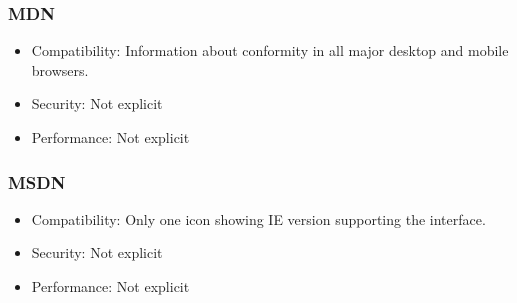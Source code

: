 \subsubsection{MDN}\label{mdn-1}

\begin{itemize}
\tightlist
\item
  Compatibility: Information about conformity in all major desktop and
  mobile browsers.
\item
  Security: Not explicit
\item
  Performance: Not explicit
\end{itemize}

\subsubsection{MSDN}\label{msdn-1}

\begin{itemize}
\tightlist
\item
  Compatibility: Only one icon showing IE version supporting the
  interface.
\item
  Security: Not explicit
\item
  Performance: Not explicit
\end{itemize}
